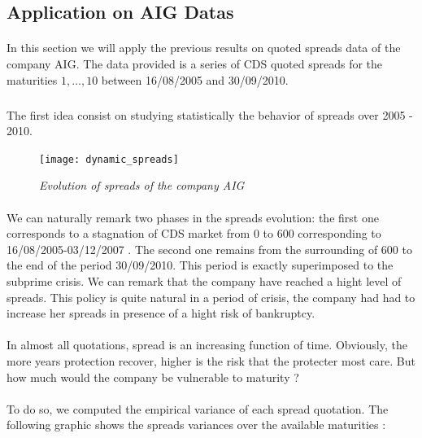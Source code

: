 
\subsection{Application on AIG Datas}
\label{sec:appl-aig-datas}
\paragraph{}
In this section we will apply the previous results on quoted spreads data of the
company  AIG. The  data provided  is  a series  of  CDS quoted  spreads for  the
maturities $1,\dots,10$ between 16/08/2005 and 30/09/2010.

\subparagraph{}
The first  idea consist on studying  statistically the behavior of  spreads over
2005 - 2010. 

\begin{figure}[H]
  \centering 
  \texttt{[image: dynamic\_spreads]}
  \caption{\it Evolution of spreads of the company AIG }
  \label{fig:5}
\end{figure}
\paragraph{}
We  can naturally  remark two  phases in  the spreads  evolution: the  first one
corresponds  to a  stagnation of  CDS  market from  0 to  600 corresponding  to
16/08/2005-03/12/2007 .  The second one remains from the surrounding of 600 to
the end  of the period  30/09/2010. This period  is exactly superimposed  to the
subprime crisis. We  can remark that the  company have reached a  hight level of
spreads. This policy  is quite  natural in  a period of  crisis, the  company had  had to
increase her spreads in presence of a hight risk of bankruptcy. \\

\paragraph{}
In almost all  quotations, spread is an increasing function  of time. Obviously,
the more  years protection recover, higher  is the risk that  the protecter most
care. But how much would the company be vulnerable to maturity ?
\paragraph{}
To do so, we computed the empirical variance of each spread quotation. 
 The following
graphic shows the spreads variances over the available maturities :

